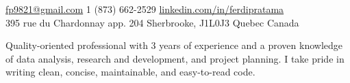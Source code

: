 \documentclass[10pt,letterpaper]{article}
\begin{document}
\sloppy  %


\nobreakvspace{0.3em}  %

\noindent\href{mailto:fp9821@gmail.com}{fp9821@gmail.com}\sbull
\textsmaller{+}1 
(873) 662-2529\sbull
\href{http://linkedin.com/in/ferdipratama}{linkedin.com/in/ferdipratama}
\\
395 rue du Chardonnay app. 204\sbull
Sherbrooke, J1L0J3\sbull
Quebec\sbull
Canada

\spacedhrule{0.9em}{-0.4em}  %


Quality-oriented professional with 3 years of experience and a proven knowledge of data analysis, research and development, and project planning. I take pride in writing clean, concise, maintainable, and easy-to-read code.

\spacedhrule{0.5em}{-0.4em}

%
%
%
\end{document}
